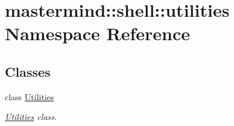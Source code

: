 \hypertarget{namespacemastermind_1_1shell_1_1utilities}{}\section{mastermind\+:\+:shell\+:\+:utilities Namespace Reference}
\label{namespacemastermind_1_1shell_1_1utilities}
\subsection*{Classes}
\begin{DoxyCompactItemize}
\item 
class \hyperlink{classmastermind_1_1shell_1_1utilities_1_1_utilities}{Utilities}
\begin{DoxyCompactList}\small\item\em \hyperlink{classmastermind_1_1shell_1_1utilities_1_1_utilities}{Utilities} class. \end{DoxyCompactList}\end{DoxyCompactItemize}
